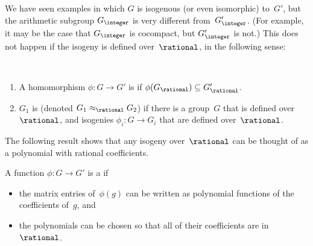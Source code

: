 We have seen examples in which $G$ is isogenous (or even isomorphic)
to~$G'$, but the arithmetic subgroup $G_{\integer}$ is very different
from~$G'_{\integer}$. (For example, it may be the case that
$G_{\integer}$ is cocompact, but $G'_{\integer}$ is not.) This
does not happen if the isogeny is defined over~$\rational$, in the following sense:

\begin{defn} 
\ %
\noprelistbreak
	 \begin{enumerate}

	 \item A homomorphism $\phi \colon G \to G'$ is 
	 if $\phi( G_{\rational} ) \subseteq G'_{\rational}$.
	 \item $G_1$ is  %
	 (denoted $G_1 \approx_\rational G_2$) if there is a
	group~$G$ that is defined over~$\rational$, and isogenies $\phi_i
	\colon G \to G_i$ that are defined over~$\rational$.
	 \end{enumerate}
 \end{defn}

The following result shows that any isogeny over~$\rational$ can be thought of as a polynomial with rational coefficients.
 
\begin{defn} 
 A function $\phi \colon G \to G'$ is a  if 
 	\begin{itemize}
	\item the matrix entries of~$\phi(g)$ can be written as polynomial functions of the coefficients of~$g$,
	and
	\item the polynomials can be chosen so that all of their coefficients are in~$\rational$.
	\end{itemize}
\end{defn}

